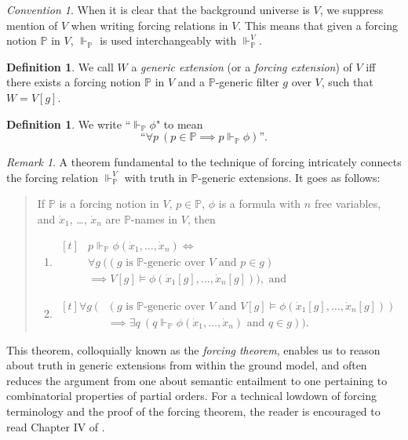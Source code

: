 \documentclass[12pt, twoside]{memoir}
\numberwithin{equation}{section}
\theoremstyle{definition}
\newtheorem{defi}[thm]{Definition}
\theoremstyle{remark}
\newtheorem{rem}[thm]{Remark}
\newtheorem{con}[thm]{Convention}
\theoremstyle{definition}
\theoremstyle{definition}
\theoremstyle{definition}
\theoremstyle{remark}
\begin{document}
\begin{con}
When it is clear that the background universe is $V$, we suppress mention of $V$ when writing forcing relations in $V$. This means that given a forcing notion $\mathbb{P}$ in $V$, $\Vdash_{\mathbb{P}}$ is used interchangeably with $\Vdash_{\mathbb{P}}^V$.
\end{con}

\begin{defi}
We call $W$ a \emph{generic extension} (or a \emph{forcing extension}) of $V$ iff there exists a forcing notion $\mathbb{P}$ in $V$ and a $\mathbb{P}$-generic filter $g$ over $V$, such that $W = V[g]$.
\end{defi}

\begin{defi}
We write ``$\Vdash_{\mathbb{P}} \phi$" to mean $$\text{``} \forall p \ (p \in \mathbb{P} \implies p \Vdash_{\mathbb{P}} \phi) \text{''.}$$ 
\end{defi}

\begin{rem}
A theorem fundamental to the technique of forcing intricately connects the forcing relation $\Vdash_{\mathbb{P}}^V$ with truth in $\mathbb{P}$-generic extensions. It goes as follows:
\begin{quote}
If $\mathbb{P}$ is a forcing notion in $V$, $p \in \mathbb{P}$, $\phi$ is a formula with $n$ free variables, and $\dot{x}_1$, \dots, $\dot{x}_n$ are $\mathbb{P}$-names in $V$, then
\begin{enumerate}[label=(\alph*)]
    \item 
    \!
    $\begin{aligned}[t]
    & p \Vdash_{\mathbb{P}} \phi(\dot{x}_1, \dots, \dot{x}_n) \iff \\
    & \forall g \ ((g \text{ is } \mathbb{P} \text{-generic over } V \text{ and } p \in g) \\
    & \implies V[g] \models \phi(\dot{x}_1[g], \dots, \dot{x}_n[g])), \text{ and}
    \end{aligned}$
    \item 
    \!
    $\begin{aligned}[t]
    \forall g \ ( & (g \text{ is } \mathbb{P} \text{-generic over } V \text{ and } V[g] \models \phi(\dot{x}_1[g], \dots, \dot{x}_n[g])) \\
    & \implies \exists q \ (q \Vdash_{\mathbb{P}} \phi(\dot{x}_1, \dots, \dot{x}_n) \text{ and } q \in g)) \text{.}
    \end{aligned}$
\end{enumerate}
\end{quote}
This theorem, colloquially known as the \emph{forcing theorem}, enables us to reason about truth in generic extensions from within the ground model, and often reduces the argument from one about semantic entailment to one pertaining to combinatorial properties of partial orders. For a technical lowdown of forcing terminology and the proof of the forcing theorem, the reader is encouraged to read Chapter IV of \cite{kunen}. 
\end{rem}
\end{document}
